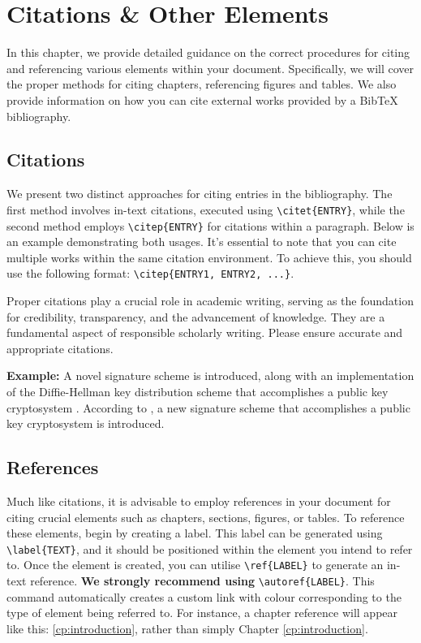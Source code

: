 \chapter{Citations \& Other Elements}
\label{cp:citations}
In this chapter, we provide detailed guidance on the correct procedures for citing and referencing various elements within your document. Specifically, we will cover the proper methods for citing chapters, referencing figures and tables. We also provide information on how you can cite external works provided by a BibTeX bibliography.

\section{Citations}
We present two distinct approaches for citing entries in the bibliography. The first method involves in-text citations, executed using \verb|\citet{ENTRY}|, while the second method employs \verb|\citep{ENTRY}| for citations within a paragraph. Below is an example demonstrating both usages. It's essential to note that you can cite multiple works within the same citation environment. To achieve this, you should use the following format: \verb|\citep{ENTRY1, ENTRY2, ...}|.

\begin{importantbox}
Proper citations play a crucial role in academic writing, serving as the foundation for credibility, transparency, and the advancement of knowledge. They are a fundamental aspect of responsible scholarly writing. Please ensure accurate and appropriate citations.
\end{importantbox}

\noindent\textbf{Example:} A novel signature scheme is introduced, along with an implementation of the Diffie-Hellman key distribution scheme that accomplishes a public key cryptosystem \citep{Elgamal1985}. According to \citet{Elgamal1985}, a new signature scheme that accomplishes a public key cryptosystem is introduced.

\section{References}
Much like citations, it is advisable to employ references in your document for citing crucial elements such as chapters, sections, figures, or tables. To reference these elements, begin by creating a label. This label can be generated using \verb|\label{TEXT}|, and it should be positioned within the element you intend to refer to. Once the element is created, you can utilise \verb|\ref{LABEL}| to generate an in-text reference. \textbf{We strongly recommend using} \verb|\autoref{LABEL}|. This command automatically creates a custom link with colour corresponding to the type of element being referred to. For instance, a chapter reference will appear like this: \autoref{cp:introduction}, rather than simply Chapter \ref{cp:introduction}. 

